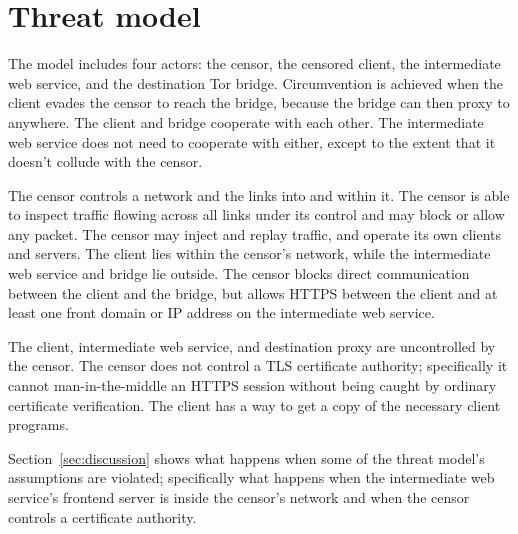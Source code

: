 \documentclass[conference]{IEEEtran}
\newcommand{\meek}{meek\xspace}
\begin{document}


\section{Threat model}

The model includes four actors:
the censor,
the censored client,
the intermediate web service,
and the destination Tor bridge.
Circumvention is achieved when the client evades the censor to reach
the bridge,
because the bridge can then proxy to anywhere.
The client and bridge cooperate with each other.
The intermediate web service does not need to cooperate with either,
except to the extent that it doesn't collude with the censor.

The censor controls a network and the links into and within it.
The censor is able to inspect traffic flowing across all links under its control
and may block or allow any packet.
The censor may inject and replay traffic, and
operate its own clients and servers.
The client lies within the censor's network,
while the intermediate web service and bridge lie outside.
The censor blocks direct communication between the client and the bridge,
but allows HTTPS between the client and at least one front domain or IP address
on the intermediate web service.


The client,
intermediate web service,
and destination proxy
are uncontrolled by the censor.
The censor does not control a TLS certificate authority;
specifically it cannot man-in-the-middle an HTTPS session
without being caught by ordinary certificate verification.
The client has a way to get a copy of the necessary client programs.

Section~\ref{sec:discussion} shows what happens when some
of the threat model's assumptions are violated;
specifically what happens
when the intermediate web service's frontend server is inside the censor's network
and when the censor controls a certificate authority.
\end{document}
